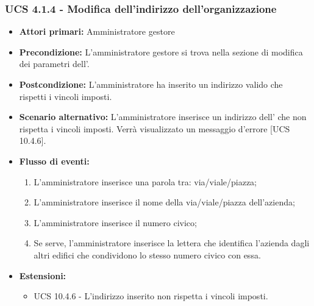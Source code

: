 \subsubsection{UCS 4.1.4 - Modifica dell'indirizzo dell'organizzazione}%

\begin{itemize}
\item \textbf{Attori primari:} Amministratore gestore
\item \textbf{Precondizione:} L'amministratore gestore si trova nella sezione di modifica dei parametri dell'.
\item \textbf{Postcondizione:} L'amministratore ha inserito un indirizzo valido che rispetti i vincoli imposti.
\item \textbf{Scenario alternativo:} L'amministratore inserisce un indirizzo dell' che non rispetta i vincoli imposti. Verrà visualizzato un messaggio d'errore [UCS 10.4.6].
\item \textbf{Flusso di eventi:}
\begin{enumerate}
    \item L'amministratore inserisce una parola tra: via/viale/piazza;
    \item L'amministratore inserisce il nome della via/viale/piazza dell'azienda;
    \item L'amministratore inserisce il numero civico;
    \item Se serve, l'amministratore inserisce la lettera che identifica l'azienda dagli altri edifici che condividono lo stesso numero civico con essa.
\end{enumerate}
\item \textbf{Estensioni:}
\begin{itemize}
    \item UCS 10.4.6 - L'indirizzo inserito non rispetta i vincoli imposti.
\end{itemize}
\end{itemize}

